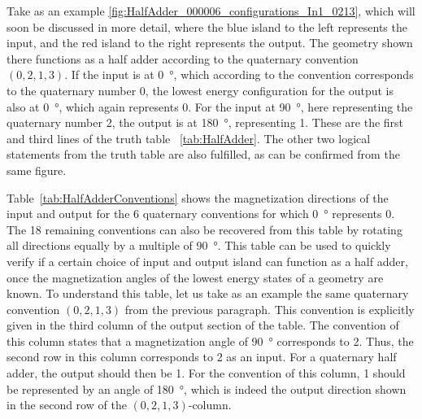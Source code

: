\documentclass[11pt,a4paper,english,twoside]{article}
\begin{document}
Take as an example \cref{fig:HalfAdder_000006_configurations_In1_0213}, which will soon be discussed in more detail, where the blue island to the left represents the input, and the red island to the right represents the output. The geometry shown there functions as a half adder according to the quaternary convention $(0, 2, 1, 3)$. If the input is at \SI{0}{\degree}, which according to the convention corresponds to the quaternary number 0, the lowest energy configuration for the output is also at \SI{0}{\degree}, which again represents 0. For the input at \SI{90}{\degree}, here representing the quaternary number 2, the output is at \SI{180}{\degree}, representing 1. These are the first and third lines of the truth table~ \ref{tab:HalfAdder}. The other two logical statements from the truth table are also fulfilled, as can be confirmed from the same figure. \par
Table~\ref{tab:HalfAdderConventions} shows the magnetization directions of the input and output for the 6 quaternary conventions for which \SI{0}{\degree} represents 0. The 18 remaining conventions can also be recovered from this table by rotating all directions equally by a multiple of \SI{90}{\degree}. This table can be used to quickly verify if a certain choice of input and output island can function as a half adder, once the magnetization angles of the lowest energy states of a geometry are known. To understand this table, let us take as an example the same quaternary convention $(0, 2, 1, 3)$ from the previous paragraph. This convention is explicitly given in the third column of the output section of the table. The convention of this column states that a magnetization angle of \SI{90}{\degree} corresponds to 2. Thus, the second row in this column corresponds to 2 as an input. For a quaternary half adder, the output should then be 1. For the convention of this column, 1 should be represented by an angle of \SI{180}{\degree}, which is indeed the output direction shown in the second row of the $(0, 2, 1, 3)$-column.
 \par
\end{document}
